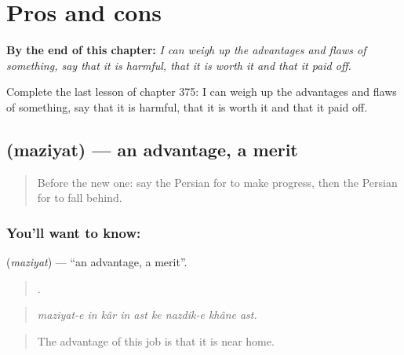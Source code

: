 
\chapter{Pros and cons}
\label{ch:fa-pros-and-cons}

\begin{chapteropening}
\textbf{By the end of this chapter:} \emph{I can weigh up the advantages and flaws of something, say that it is harmful, that it is worth it and that it paid off.}

Complete the last lesson of chapter 375: I can weigh up the advantages and flaws of something, say that it is harmful, that it is worth it and that it paid off.
\end{chapteropening}

\section[\texorpdfstring{\fa{مزیت} (maziyat)}{مزیت (maziyat)}]{ (maziyat) — an advantage, a merit}

\label{lesson:FA-C375-maziyyat}



\begin{quote}
Before the new one: say the Persian for to make progress, then the Persian for to fall behind.
\end{quote}

\subsection*{You'll want to know: }
\textbf{} (\emph{maziyat}) — \textquotedblleft{}an advantage, a merit\textquotedblright{}.

\begin{quote}
        .
\end{quote}

\begin{quote}
\emph{maziyat-e in kâr in ast ke nazdik-e khâne ast.}
\end{quote}

\begin{quote}
The advantage of this job is that it is near home.
\end{quote}

